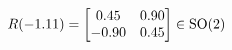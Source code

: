 \documentclass[preview]{standalone}
\begin{document}
\begin{align*}
\special{dvisvgm:raw <g id='unique000'>}R(-1.11) = \begin{bmatrix} 0.45 & 0.90 \\ -0.90 & 0.45 \end{bmatrix} \in \text{SO}(2)\special{dvisvgm:raw </g>}
\end{align*}
\end{document}
